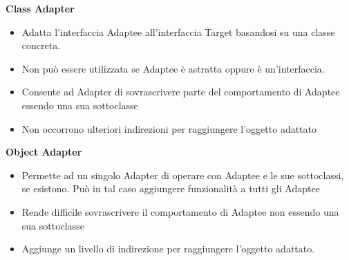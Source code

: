 \textbf{Class Adapter}
\begin{itemize}
    \item Adatta l'interfaccia Adaptee all'interfaccia Target basandosi su una classe concreta.
    \item Non può essere utilizzata se Adaptee è astratta oppure è un'interfaccia.
    \item Consente ad Adapter di sovrascrivere parte del comportamento di Adaptee essendo una sua sottoclasse
    \item Non occorrono ulteriori indirezioni per raggiungere l'oggetto adattato
\end{itemize}

\textbf{Object Adapter}
\begin{itemize}
    \item Permette ad un singolo Adapter di operare con Adaptee e le sue sottoclassi, se esistono. Può in tal caso aggiungere funzionalità a tutti gli Adaptee
    \item Rende difficile sovrascrivere il comportamento di Adaptee non essendo una sua sottoclasse
    \item Aggiunge un livello di indirezione per raggiungere l'oggetto adattato.
\end{itemize}

\newpage